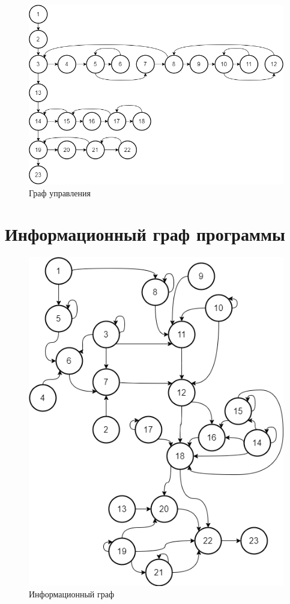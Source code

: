 \documentclass[12pt]{report}
\begin{document}
\begin{figure}[H]
	\centering
	\includegraphics[scale=0.7]{GU.png}
	\caption{Граф управления}
	\label{GU}
\end{figure}

\section{Информационный граф программы}

\begin{figure}[H]
	\centering
	\includegraphics[scale=0.7]{IG.png}
	\caption{Информационный граф}
	\label{IG}
\end{figure}
\end{document}
